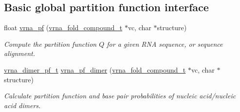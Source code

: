 \subsection*{Basic global partition function interface}
\begin{DoxyCompactItemize}
\item 
float \mbox{\hyperlink{group__part__func__global_ga29e256d688ad221b78d37f427e0e99bc}{vrna\+\_\+pf}} (\mbox{\hyperlink{group__fold__compound_ga1b0cef17fd40466cef5968eaeeff6166}{vrna\+\_\+fold\+\_\+compound\+\_\+t}} $\ast$vc, char $\ast$structure)
\begin{DoxyCompactList}\small\item\em Compute the partition function $Q$ for a given R\+NA sequence, or sequence alignment. \end{DoxyCompactList}\item 
\mbox{\hyperlink{group__pf__cofold_ga444df1587c9a2ca15b8eb25188f629c3}{vrna\+\_\+dimer\+\_\+pf\+\_\+t}} \mbox{\hyperlink{group__part__func__global_ga4e5c7d06c302a7c59fc0d64dc142ca63}{vrna\+\_\+pf\+\_\+dimer}} (\mbox{\hyperlink{group__fold__compound_ga1b0cef17fd40466cef5968eaeeff6166}{vrna\+\_\+fold\+\_\+compound\+\_\+t}} $\ast$vc, char $\ast$structure)
\begin{DoxyCompactList}\small\item\em Calculate partition function and base pair probabilities of nucleic acid/nucleic acid dimers. \end{DoxyCompactList}\end{DoxyCompactItemize}
